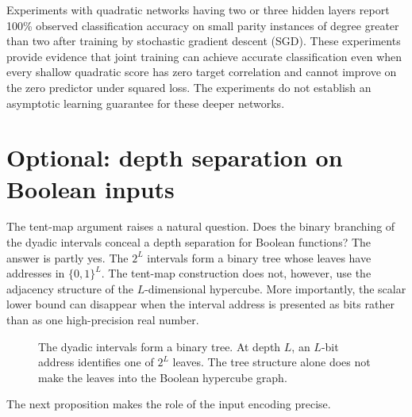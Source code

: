 \documentclass[11pt,twoside]{article}
\theoremstyle{definition}
\theoremstyle{remark}
\begin{document}
Experiments with quadratic networks having two or three hidden layers report
100\% observed classification accuracy on small parity instances of degree
greater than two after training by stochastic gradient descent (SGD).
These experiments provide evidence that joint training can achieve accurate
classification even when every shallow quadratic score has zero target
correlation and cannot improve on the zero predictor under squared loss.
The experiments do not establish an asymptotic learning guarantee for these
deeper networks.

\section*{Optional: depth separation on Boolean inputs}

The tent-map argument raises a natural question. Does the binary branching
of the dyadic intervals conceal a depth separation for Boolean functions?
The answer is partly yes. The $2^L$ intervals form a binary tree whose leaves
have addresses in $\{0,1\}^L$. The tent-map construction does not, however,
use the adjacency structure of the $L$-dimensional hypercube. More
importantly, the scalar lower bound can disappear when the interval address
is presented as bits rather than as one high-precision real number.

\begin{figure}[ht]
\centering
{}
\caption{The dyadic intervals form a binary tree. At depth $L$, an
$L$-bit address identifies one of $2^L$ leaves. The tree structure alone
does not make the leaves into the Boolean hypercube graph.}
\label{fig:dyadic-tree}
\end{figure}

The next proposition makes the role of the input encoding precise.
\end{document}
